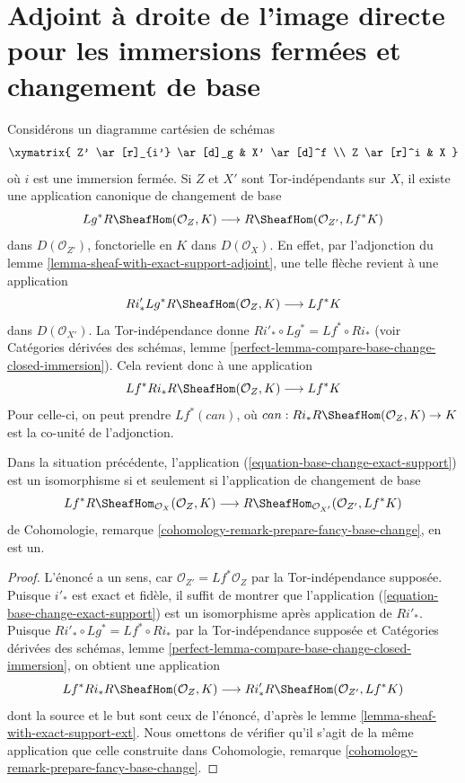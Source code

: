 \section{Adjoint à droite de l'image directe pour les immersions fermées et changement de base}
\label{section-sections-with-exact-support-base-change}

\noindent
Considérons un diagramme cartésien de schémas
$$
\xymatrix{
Z' \ar[r]_{i'} \ar[d]_g & X' \ar[d]^f \\
Z \ar[r]^i & X
}
$$
où $i$ est une immersion fermée. Si $Z$ et $X'$ sont Tor-indépendants sur $X$, il existe une application canonique de changement de base
\begin{equation}
\label{equation-base-change-exact-support}
Lg^*R\SheafHom(\mathcal{O}_Z, K)
\longrightarrow
R\SheafHom(\mathcal{O}_{Z'}, Lf^*K)
\end{equation}
dans $D(\mathcal{O}_{Z'})$, fonctorielle en $K$ dans $D(\mathcal{O}_X)$. En effet, par l'adjonction du lemme \ref{lemma-sheaf-with-exact-support-adjoint}, une telle flèche revient à une application
$$
Ri'_*Lg^*R\SheafHom(\mathcal{O}_Z, K)
\longrightarrow
Lf^*K
$$
dans $D(\mathcal{O}_{X'})$. La Tor-indépendance donne $Ri'_* \circ Lg^* = Lf^* \circ Ri_*$ (voir Catégories dérivées des schémas, lemme \ref{perfect-lemma-compare-base-change-closed-immersion}). Cela revient donc à une application
$$
Lf^*Ri_*R\SheafHom(\mathcal{O}_Z, K)
\longrightarrow
Lf^*K
$$
Pour celle-ci, on peut prendre $Lf^*(can)$, où $can : Ri_* R\SheafHom(\mathcal{O}_Z, K) \to K$ est la co-unité de l'adjonction.

\begin{lemma}
\label{lemma-check-base-change-is-iso}
Dans la situation précédente, l'application (\ref{equation-base-change-exact-support}) est un isomorphisme si et seulement si l'application de changement de base
$$
Lf^*R\SheafHom_{\mathcal{O}_X}(\mathcal{O}_Z, K)
\longrightarrow
R\SheafHom_{\mathcal{O}_{X'}}(\mathcal{O}_{Z'}, Lf^*K)
$$
de Cohomologie, remarque \ref{cohomology-remark-prepare-fancy-base-change}, en est un.
\end{lemma}

\begin{proof}
L'énoncé a un sens, car $\mathcal{O}_{Z'} = Lf^*\mathcal{O}_Z$ par la Tor-indépendance supposée. Puisque $i'_*$ est exact et fidèle, il suffit de montrer que l'application (\ref{equation-base-change-exact-support}) est un isomorphisme après application de $Ri'_*$. Puisque $Ri'_* \circ Lg^* = Lf^* \circ Ri_*$ par la Tor-indépendance supposée et Catégories dérivées des schémas, lemme \ref{perfect-lemma-compare-base-change-closed-immersion}, on obtient une application
$$
Lf^*Ri_*R\SheafHom(\mathcal{O}_Z, K)
\longrightarrow
Ri'_*R\SheafHom(\mathcal{O}_{Z'}, Lf^*K)
$$
dont la source et le but sont ceux de l'énoncé, d'après le lemme \ref{lemma-sheaf-with-exact-support-ext}. Nous omettons de vérifier qu'il s'agit de la même application que celle construite dans Cohomologie, remarque \ref{cohomology-remark-prepare-fancy-base-change}.
\end{proof}

